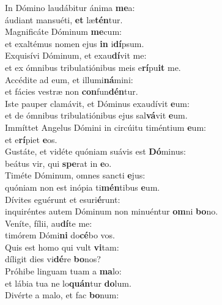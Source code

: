 \evenverse In Dómino laudábitur ánima \textbf{me}a:~\*\\
\evenverse áudiant mansuéti, \textbf{et} læ\textbf{tén}tur.\\
\oddverse Magnificáte Dóminum \textbf{me}cum:~\*\\
\oddverse et exaltémus nomen ejus \textbf{in} i\textbf{dí}psum.\\
\evenverse Exquisívi Dóminum, et exau\textbf{dí}vit me:~\*\\
\evenverse et ex ómnibus tribulatiónibus meis e\textbf{rí}pu\textbf{it} me.\\
\oddverse Accédite ad eum, et illumi\textbf{ná}mini:~\*\\
\oddverse et fácies vestræ non \textbf{con}fun\textbf{dén}tur.\\
\evenverse Iste pauper clamávit, et Dóminus exaudívit \textbf{e}um:~\*\\
\evenverse et de ómnibus tribulatiónibus ejus sal\textbf{vá}vit \textbf{e}um.\\
\oddverse Immíttet Angelus Dómini in circúitu timéntium \textbf{e}um:~\*\\
\oddverse et e\textbf{rí}piet \textbf{e}os.\\
\evenverse Gustáte, et vidéte quóniam suávis est \textbf{Dó}minus:~\*\\
\evenverse beátus vir, qui \textbf{spe}rat in \textbf{e}o.\\
\oddverse Timéte Dóminum, omnes sancti \textbf{e}jus:~\*\\
\oddverse quóniam non est inópia ti\textbf{mén}tibus \textbf{e}um.\\
\evenverse Dívites eguérunt et esuri\textbf{é}runt:~\*\\
\evenverse inquiréntes autem Dóminum non minuéntur \textbf{om}ni \textbf{bo}no.\\
\oddverse Veníte, fílii, au\textbf{dí}te me:~\*\\
\oddverse timórem Dómi\textbf{ni} do\textbf{cé}bo vos.\\
\evenverse Quis est homo qui vult \textbf{vi}tam:~\*\\
\evenverse díligit dies vi\textbf{dé}re \textbf{bo}nos?\\
\oddverse Próhibe linguam tuam a \textbf{ma}lo:~\*\\
\oddverse et lábia tua ne lo\textbf{quán}tur \textbf{do}lum.\\
\evenverse Divérte a malo, et fac \textbf{bo}num:~\*\\

